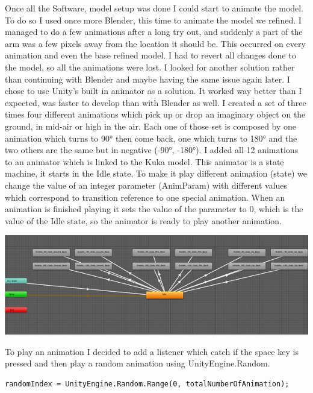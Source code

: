 \documentclass{scrartcl}
\begin{document}
Once all the Software, model setup was done I could start to animate the model. To do so I used once more Blender, 
this time to animate the model we refined. I managed to do a few animations after a long try out, 
and suddenly a part of the arm was a few pixels away from the location it should be. This occurred on every animation and even the base refined model. 
I had to revert all changes done to the model, so all the animations were lost. I looked for another solution rather than continuing with Blender 
and maybe having the same issue again later. I chose to use Unity’s built in animator as a solution. 
It worked way better than I expected, was faster to develop than with Blender as well. I created a set of three times four different animations 
which pick up or drop an imaginary object on the ground, in mid-air or high in the air. 
Each one of those set is composed by one animation which turns to 90° then come back, one which turns to 180° and the two others are the same but in negative (-90°, -180°). 
I added all 12 animations to an animator which is linked to the Kuka model. This animator is a state machine, it starts in the Idle state. 
To make it play different animation (state) we change the value of an integer parameter (AnimParam) with different values 
which correspond to transition reference to one special animation. When an animation is finished playing it sets the value of the parameter to 0, 
which is the value of the Idle state, so the animator is ready to play another animation. 

\includegraphics{animator}

To play an animation I decided to add a listener which catch if the space key is pressed and then play a random animation using UnityEngine.Random.
\begin{lstlisting}[language={[Sharp]C}]
  randomIndex = UnityEngine.Random.Range(0, totalNumberOfAnimation);
\end{lstlisting}
\end{document}
